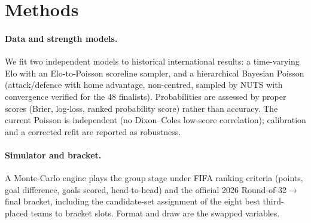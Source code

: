 \documentclass[11pt]{article}
\begin{document}
\section*{Methods}
\paragraph{Data and strength models.} We fit two independent models to historical international
results: a time-varying Elo with an Elo-to-Poisson scoreline sampler, and a hierarchical Bayesian
Poisson (attack/defence with home advantage, non-centred, sampled by NUTS with convergence verified
for the 48 finalists). Probabilities are assessed by proper scores (Brier, log-loss, ranked
probability score) \cite{gneiting2007scoring} rather than accuracy. The current Poisson is
independent (no Dixon--Coles low-score correlation); calibration and a corrected refit are reported
as robustness.
\paragraph{Simulator and bracket.} A Monte-Carlo engine plays the group stage under FIFA ranking
criteria (points, goal difference, goals scored, head-to-head) and the official 2026
Round-of-32$\rightarrow$final bracket, including the candidate-set assignment of the eight best
third-placed teams to bracket slots. Format and draw are the swapped variables.
\end{document}
